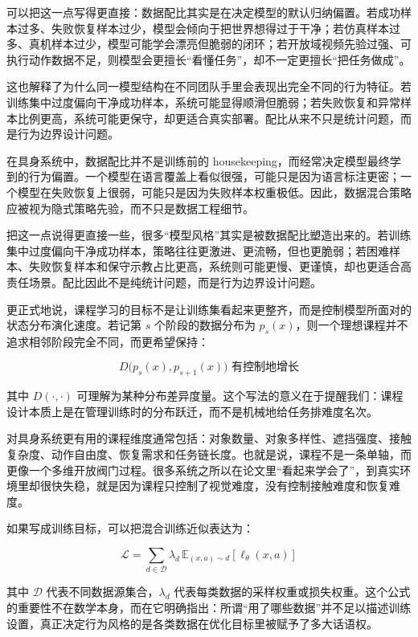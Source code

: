 可以把这一点写得更直接：数据配比其实是在决定模型的默认归纳偏置。若成功样本过多、失败恢复样本过少，模型会倾向于把世界想得过于干净；若仿真样本过多、真机样本过少，模型可能学会漂亮但脆弱的闭环；若开放域视频先验过强、可执行动作数据不足，则模型会更擅长“看懂任务”，却不一定更擅长“把任务做成”。

这也解释了为什么同一模型结构在不同团队手里会表现出完全不同的行为特征。若训练集中过度偏向干净成功样本，系统可能显得顺滑但脆弱；若失败恢复和异常样本比例更高，系统可能更保守，却更适合真实部署。配比从来不只是统计问题，而是行为边界设计问题。

在具身系统中，数据配比并不是训练前的 housekeeping，而经常决定模型最终学到的行为偏置。一个模型在语言覆盖上看似很强，可能只是因为语言标注更密；一个模型在失败恢复上很弱，可能只是因为失败样本权重极低。因此，数据混合策略应被视为隐式策略先验，而不只是数据工程细节。

把这一点说得更直接一些，很多“模型风格”其实是被数据配比塑造出来的。若训练集中过度偏向干净成功样本，策略往往更激进、更流畅，但也更脆弱；若困难样本、失败恢复样本和保守示教占比更高，系统则可能更慢、更谨慎，却也更适合高责任场景。配比因此不是纯统计问题，而是行为边界设计问题。

更正式地说，课程学习的目标不是让训练集看起来更整齐，而是控制模型所面对的状态分布演化速度。若记第 \(s\) 个阶段的数据分布为 \(p_s(x)\)，则一个理想课程并不追求相邻阶段完全不同，而更希望保持：

\begin{equation*}
D\bigl(p_s(x), p_{s+1}(x)\bigr) \text{ 有控制地增长}
\end{equation*}

其中 \(D(\cdot,\cdot)\) 可理解为某种分布差异度量。这个写法的意义在于提醒我们：课程设计本质上是在管理训练时的分布跃迁，而不是机械地给任务排难度名次。

对具身系统更有用的课程维度通常包括：对象数量、对象多样性、遮挡强度、接触复杂度、动作自由度、恢复需求和任务链长度。也就是说，课程不是一条单轴，而更像一个多维开放阀门过程。很多系统之所以在论文里“看起来学会了”，到真实环境里却很快失稳，就是因为课程只控制了视觉难度，没有控制接触难度和恢复难度。

如果写成训练目标，可以把混合训练近似表达为：

\begingroup
\scriptsize
\begin{equation*}
\mathcal{L} = \sum_{d \in \mathcal{D}} \lambda_d \, \mathbb{E}_{(x,a)\sim d}[\ell_\theta(x,a)]
\end{equation*}
\endgroup

其中 \(\mathcal{D}\) 代表不同数据源集合，\(\lambda_d\) 代表每类数据的采样权重或损失权重。这个公式的重要性不在数学本身，而在它明确指出：所谓“用了哪些数据”并不足以描述训练设置，真正决定行为风格的是各类数据在优化目标里被赋予了多大话语权。

